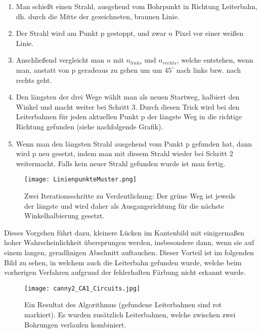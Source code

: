 \begin{enumerate}
\item Man schießt einen Strahl, ausgehend vom Bohrpunkt in Richtung Leiterbahn, dh. durch die Mitte der gezeichneten, braunen Linie.
\item Der Strahl wird am Punkt p gestoppt, und zwar $n$ Pixel vor einer weißen Linie.
\item Anschließend vergleicht man $n$ mit $n_{links}$ und $n_{rechts}$, welche entstehen, wenn man, anstatt von p geradeaus zu gehen um um $45^\circ$ nach links bzw. nach rechts geht. 
\item Den längsten der drei Wege wählt man als neuen Startweg, halbiert den Winkel und macht weiter bei Schritt 3. Durch diesen Trick wird bei den Leiterbahnen für jeden aktuellen Punkt p der längste Weg in die richtige Richtung gefunden (siehe nachfolgende Grafik).
\item Wenn man den längsten Strahl ausgehend vom Punkt p gefunden hat, dann wird p neu gesetzt, indem man mit diesem Strahl wieder bei Schritt 2 weitermacht. Falls kein neuer Strahl gefunden wurde ist man fertig.
\end{enumerate}

\begin{figure}[H]
  \begin{center}
    \texttt{[image: LinienpunkteMuster.png]}
    \caption{Zwei Iterationsschritte zu Verdeutlichung: Der grüne Weg ist jeweils der längste und wird daher als Ausgangsrichtung für die nächste Winkelhalbierung gesetzt.}
    \label{fig:linepoints}
  \end{center}
\end{figure}

Dieses Vorgehen führt dazu, kleinere Lücken im Kantenbild mit einigermaßen hoher Wahrscheinlichkeit übersprungen werden, insbesondere dann, wenn sie auf einem langen, geradlinigen Abschnitt auftauchen. Dieser Vorteil ist im folgenden Bild zu sehen, in welchem auch die Leiterbahn gefunden wurde, welche beim vorherigen Verfahren aufgrund der fehlerhaften Färbung nicht erkannt wurde.

\begin{figure}[H]
  \begin{center}
    \texttt{[image: canny2\_CA1\_Circuits.jpg]}
    \caption{Ein Resultat des Algorithmus (gefundene Leiterbahnen sind rot markiert). Es wurden zusätzlich Leiterbahnen, welche zwischen zwei Bohrungen verlaufen kombiniert.}
    \label{fig:linepoints2}
  \end{center}
\end{figure}


